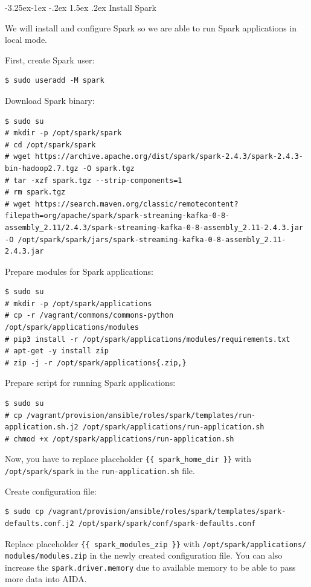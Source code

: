 \documentclass[a4paper]{article} %
\makeatletter
\renewcommand{\normalsize}{\fontsize{12}{15}\selectfont\color{textcolor}}
\renewcommand\subsubsection{\@startsection{subsubsection}{3}{\z@}%
                   {-3.25ex\@plus -1ex \@minus -.2ex}%
                   {1.5ex \@plus .2ex}%
                   {\normalfont\sffamily\normalsize\bfseries\color{projectcolor}}}
\makeatother
\begin{document}
\subsubsection{Install Spark}

We will install and configure Spark so we are able to run Spark applications in local mode.

First, create Spark user:
\begin{lstlisting}
$ sudo useradd -M spark
\end{lstlisting}

Download Spark binary:
\begin{lstlisting}
$ sudo su
# mkdir -p /opt/spark/spark
# cd /opt/spark/spark
# wget https://archive.apache.org/dist/spark/spark-2.4.3/spark-2.4.3-bin-hadoop2.7.tgz -O spark.tgz
# tar -xzf spark.tgz --strip-components=1
# rm spark.tgz
# wget https://search.maven.org/classic/remotecontent?filepath=org/apache/spark/spark-streaming-kafka-0-8-assembly_2.11/2.4.3/spark-streaming-kafka-0-8-assembly_2.11-2.4.3.jar -O /opt/spark/spark/jars/spark-streaming-kafka-0-8-assembly_2.11-2.4.3.jar
\end{lstlisting}

Prepare modules for Spark applications:
\begin{lstlisting}
$ sudo su
# mkdir -p /opt/spark/applications
# cp -r /vagrant/commons/commons-python /opt/spark/applications/modules
# pip3 install -r /opt/spark/applications/modules/requirements.txt
# apt-get -y install zip
# zip -j -r /opt/spark/applications{.zip,}
\end{lstlisting}

Prepare script for running Spark applications:
\begin{lstlisting}
$ sudo su
# cp /vagrant/provision/ansible/roles/spark/templates/run-application.sh.j2 /opt/spark/applications/run-application.sh
# chmod +x /opt/spark/applications/run-application.sh
\end{lstlisting}

Now, you have to replace placeholder \texttt{\{\{ spark\_home\_dir \}\}} with \texttt{/opt/spark/spark} in the \texttt{run-application.sh} file.

Create configuration file:
\begin{lstlisting}
$ sudo cp /vagrant/provision/ansible/roles/spark/templates/spark-defaults.conf.j2 /opt/spark/spark/conf/spark-defaults.conf
\end{lstlisting}

Replace placeholder \texttt{\{\{ spark\_modules\_zip \}\}} with \texttt{/opt/spark/applications/\\modules/modules.zip} in the newly created configuration file. You can also increase the \texttt{spark.driver.memory} due to available memory to be able to pass more data into AIDA.
\end{document}
